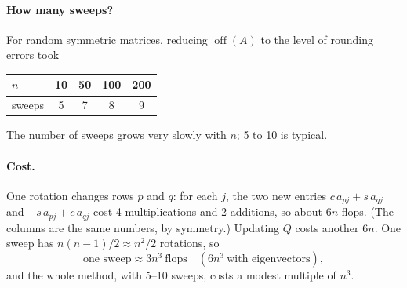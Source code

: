 \documentclass[11pt,a4paper]{article}
\theoremstyle{definition}
\theoremstyle{remark}
\newcommand{\off}{\operatorname{off}}
\begin{document}
\paragraph{How many sweeps?} For random symmetric matrices, reducing $\off(A)$ to the level of rounding errors took
\begin{center}
\begin{tabular}{@{}lcccc@{}}\toprule
$n$ & 10 & 50 & 100 & 200\\ \midrule
sweeps & 5 & 7 & 8 & 9\\ \bottomrule
\end{tabular}
\end{center}
The number of sweeps grows very slowly with $n$; 5 to 10 is typical.

\paragraph{Cost.} One rotation changes rows $p$ and $q$: for each $j$, the two new entries
$c\,a_{pj}+s\,a_{qj}$ and $-s\,a_{pj}+c\,a_{qj}$ cost 4 multiplications and 2 additions, so about $6n$ flops. (The columns are
the same numbers, by symmetry.) Updating $Q$ costs another $6n$. One sweep has $n(n-1)/2\approx n^2/2$ rotations, so
\[
\text{one sweep}\approx 3n^3\ \text{flops}\quad(6n^3\ \text{with eigenvectors}),
\]
and the whole method, with 5--10 sweeps, costs a modest multiple of $n^3$.

\end{document}
